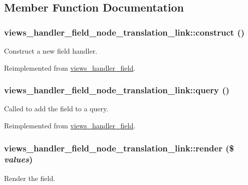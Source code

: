 \subsection{Member Function Documentation}
\hypertarget{classviews__handler__field__node__translation__link_a834c20607c0a929900b7ace53425847a}{
\subsubsection[{construct}]{\setlength{\rightskip}{0pt plus 5cm}views\_\-handler\_\-field\_\-node\_\-translation\_\-link::construct ()}}
\label{classviews__handler__field__node__translation__link_a834c20607c0a929900b7ace53425847a}
Construct a new field handler. 

Reimplemented from \hyperlink{classviews__handler__field_a3d50050864c255b71c842972a45d39f6}{views\_\-handler\_\-field}.\hypertarget{classviews__handler__field__node__translation__link_accd7784b851085dadf55b773f1845097}{
\subsubsection[{query}]{\setlength{\rightskip}{0pt plus 5cm}views\_\-handler\_\-field\_\-node\_\-translation\_\-link::query ()}}
\label{classviews__handler__field__node__translation__link_accd7784b851085dadf55b773f1845097}
Called to add the field to a query. 

Reimplemented from \hyperlink{classviews__handler__field_a4f661f91bcbe80d4a00c30a31456c502}{views\_\-handler\_\-field}.\hypertarget{classviews__handler__field__node__translation__link_a24fd39ca3d02b69858986ee7ba580d41}{
\subsubsection[{render}]{\setlength{\rightskip}{0pt plus 5cm}views\_\-handler\_\-field\_\-node\_\-translation\_\-link::render (\$ {\em values})}}
\label{classviews__handler__field__node__translation__link_a24fd39ca3d02b69858986ee7ba580d41}
Render the field.



